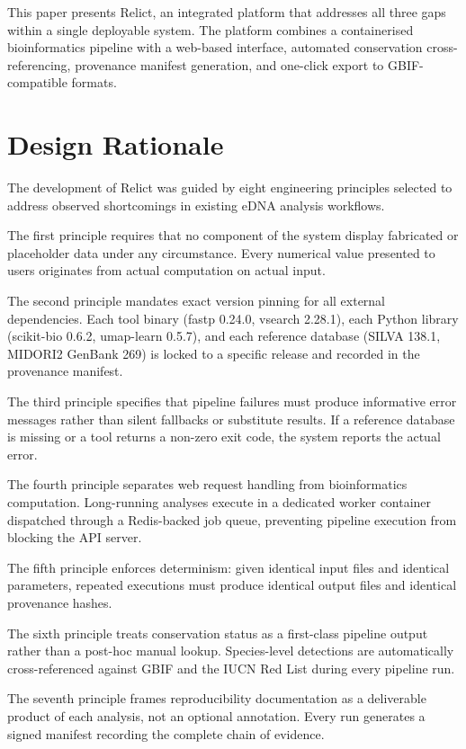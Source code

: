 \documentclass[runningheads]{llncs}
\begin{document}
This paper presents Relict, an integrated platform that addresses all three gaps within a single deployable system. The platform combines a containerised bioinformatics pipeline with a web-based interface, automated conservation cross-referencing, provenance manifest generation, and one-click export to GBIF-compatible formats.

\section{Design Rationale}

The development of Relict was guided by eight engineering principles selected to address observed shortcomings in existing eDNA analysis workflows.

The first principle requires that no component of the system display fabricated or placeholder data under any circumstance. Every numerical value presented to users originates from actual computation on actual input.

The second principle mandates exact version pinning for all external dependencies. Each tool binary (fastp 0.24.0, vsearch 2.28.1), each Python library (scikit-bio 0.6.2, umap-learn 0.5.7), and each reference database (SILVA 138.1, MIDORI2 GenBank 269) is locked to a specific release and recorded in the provenance manifest.

The third principle specifies that pipeline failures must produce informative error messages rather than silent fallbacks or substitute results. If a reference database is missing or a tool returns a non-zero exit code, the system reports the actual error.

The fourth principle separates web request handling from bioinformatics computation. Long-running analyses execute in a dedicated worker container dispatched through a Redis-backed job queue, preventing pipeline execution from blocking the API server.

The fifth principle enforces determinism: given identical input files and identical parameters, repeated executions must produce identical output files and identical provenance hashes.

The sixth principle treats conservation status as a first-class pipeline output rather than a post-hoc manual lookup. Species-level detections are automatically cross-referenced against GBIF and the IUCN Red List during every pipeline run.

The seventh principle frames reproducibility documentation as a deliverable product of each analysis, not an optional annotation. Every run generates a signed manifest recording the complete chain of evidence.
\end{document}
